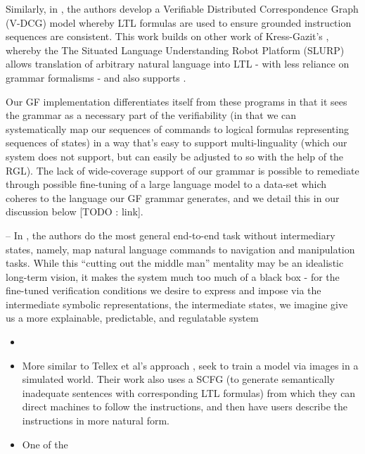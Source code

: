 \documentclass[a4paper, 11pt]{article}
\begin{document}
Similarly, in \cite{7759412}, the authors develop a Verifiable Distributed
Correspondence Graph (V-DCG) model whereby LTL formulas are used to ensure
grounded instruction sequences are consistent. This work builds on other work of
Kress-Gazit's \cite{provCorrectNatControl}, whereby the The Situated Language
Understanding Robot Platform (SLURP) allows translation of arbitrary natural
language into LTL - with less reliance on grammar formalisms - and also supports
.

Our GF implementation differentiates itself from these programs in that it sees
the grammar as a necessary part of the verifiability (in that we can
systematically map our sequences of commands to logical formulas representing
sequences of states) in a way that's easy to support multi-linguality (which our
system does not support, but can easily be adjusted to so with the help of the
RGL). The lack of wide-coverage support of our grammar is possible to remediate
through possible fine-tuning of a large language model to a data-set which
coheres to the language our GF grammar generates, and we detail this in our
discussion below [TODO : link].

--
In \cite{kuo2020deep}, the authors do the most general end-to-end task without
intermediary states, namely, map natural language commands to navigation and
manipulation tasks. While this ``cutting out the middle man'' mentality may be
an idealistic long-term vision, it makes the system much too much of a black box
- for the fine-tuned verification conditions we desire to express and impose via
the intermediate symbolic representations, the intermediate states, we imagine
give us a more explainable, predictable, and regulatable system


\begin{itemize}
\item

\item More similar to Tellex et al's approach \cite{patellearning},
  \cite{ltlSemParse} seek to train a model via images in a simulated world.
  Their work also uses a SCFG (to generate semantically inadequate sentences
  with corresponding LTL formulas) from which they can direct machines to
  follow the instructions, and then have users describe the instructions in more
  natural form. 
\item One of the 
\end{itemize}
\end{document}
